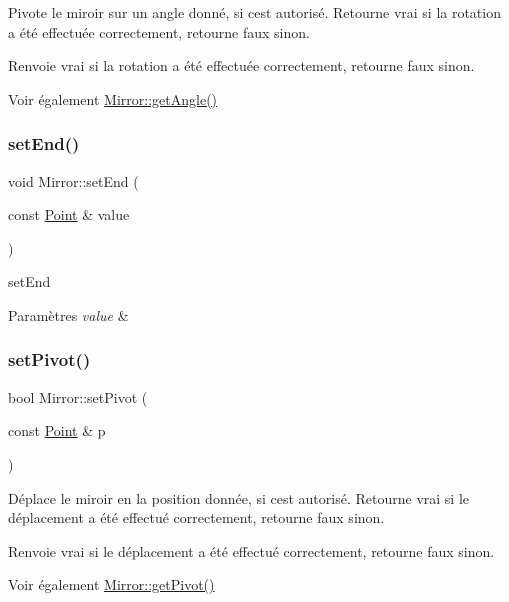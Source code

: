 Pivote le miroir sur un angle donné, si c\textquotesingle{}est autorisé. Retourne vrai si la rotation a été effectuée correctement, retourne faux sinon. \begin{DoxyReturn}{Renvoie}
vrai si la rotation a été effectuée correctement, retourne faux sinon. 
\end{DoxyReturn}
\begin{DoxySeeAlso}{Voir également}
\mbox{\hyperlink{class_mirror_a940340beb2acaf99f7942615f5ef82a0}{Mirror\+::get\+Angle()}} 
\end{DoxySeeAlso}
\mbox{\label{class_mirror_a23b77987f958dd1272f204e4be6e5f75}} 
\subsubsection{\texorpdfstring{setEnd()}{setEnd()}}
{\footnotesize\ttfamily void Mirror\+::set\+End (\begin{DoxyParamCaption}\item[{const \mbox{\hyperlink{class_point}{Point}} \&}]{value }\end{DoxyParamCaption})}



set\+End 


\begin{DoxyParams}{Paramètres}
{\em value} & \\
\hline
\end{DoxyParams}
\mbox{\label{class_mirror_a83f8934245fe330510b031a19fa77fbe}} 
\subsubsection{\texorpdfstring{setPivot()}{setPivot()}}
{\footnotesize\ttfamily bool Mirror\+::set\+Pivot (\begin{DoxyParamCaption}\item[{const \mbox{\hyperlink{class_point}{Point}} \&}]{p }\end{DoxyParamCaption})}

Déplace le miroir en la position donnée, si c\textquotesingle{}est autorisé. Retourne vrai si le déplacement a été effectué correctement, retourne faux sinon. \begin{DoxyReturn}{Renvoie}
vrai si le déplacement a été effectué correctement, retourne faux sinon. 
\end{DoxyReturn}
\begin{DoxySeeAlso}{Voir également}
\mbox{\hyperlink{class_mirror_af419b1b2478e02211ff5b6369453a7ca}{Mirror\+::get\+Pivot()}} 
\end{DoxySeeAlso}
\mbox{\label{class_mirror_af3b7feed3826bb6e06d69dcee40d73fe}} 
